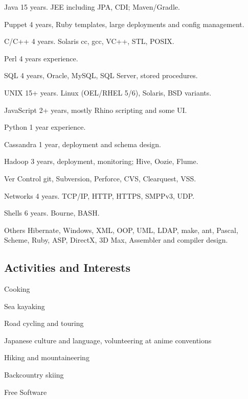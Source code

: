 \documentclass{article}
\begin{document}
\begin{items}
\item[Java] 15 years. JEE including JPA, CDI; Maven/Gradle.
\item[Puppet] 4 years, Ruby templates, large deployments and config management.
\item[C/C++] 4 years. Solaris cc, gcc, VC++, STL, POSIX.
\item[Perl] 4 years experience.
\item[SQL] 4 years, Oracle, MySQL, SQL Server, stored procedures.
\item[UNIX] 15+ years. Linux (OEL/RHEL 5/6), Solaris, BSD variants.
\item[JavaScript] 2+ years, mostly Rhino scripting and some UI.
\item[Python] 1 year experience.
\item[Cassandra] 1 year, deployment and schema design.
\item[Hadoop] 3 years, deployment, monitoring; Hive, Oozie, Flume.
\item[Ver Control] git, Subversion, Perforce, CVS, Clearquest, VSS.
\item[Networks] 4 years. TCP/IP, HTTP, HTTPS, SMPPv3, UDP.
\item[Shells] 6 years. Bourne, BASH.
\item[Others] Hibernate, Windows, XML, OOP, UML, LDAP, make, ant, Pascal,
Scheme, Ruby, ASP, DirectX, 3D Max, Assembler and compiler design.
\end{items}

\subsection*{Activities and Interests}
\begin{items}
\item Cooking
\item Sea kayaking
\item Road cycling and touring
\item Japanese culture and language, volunteering at anime conventions
\item Hiking and mountaineering
\item Backcountry skiing
\item Free Software
\end{items}


\end{document}
